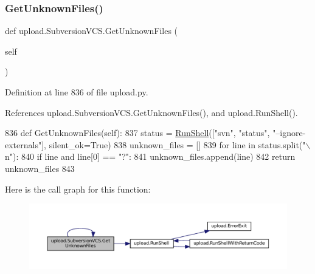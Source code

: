 \subsubsection{\texorpdfstring{Get\+Unknown\+Files()}{GetUnknownFiles()}\hspace{0.1cm}{\footnotesize\ttfamily [2/2]}}
{\footnotesize\ttfamily def upload.\+Subversion\+V\+C\+S.\+Get\+Unknown\+Files (\begin{DoxyParamCaption}\item[{}]{self }\end{DoxyParamCaption})}



Definition at line 836 of file upload.\+py.



References upload.\+Subversion\+V\+C\+S.\+Get\+Unknown\+Files(), and upload.\+Run\+Shell().


\begin{DoxyCode}
836   \textcolor{keyword}{def }GetUnknownFiles(self):
837     status = \hyperlink{namespaceupload_adddc423c49132e8879cbb25d6be2cf11}{RunShell}([\textcolor{stringliteral}{"svn"}, \textcolor{stringliteral}{"status"}, \textcolor{stringliteral}{"--ignore-externals"}], silent\_ok=\textcolor{keyword}{True})
838     unknown\_files = []
839     \textcolor{keywordflow}{for} line \textcolor{keywordflow}{in} status.split(\textcolor{stringliteral}{"\(\backslash\)n"}):
840       \textcolor{keywordflow}{if} line \textcolor{keywordflow}{and} line[0] == \textcolor{stringliteral}{"?"}:
841         unknown\_files.append(line)
842     \textcolor{keywordflow}{return} unknown\_files
843 
\end{DoxyCode}
Here is the call graph for this function\+:
\nopagebreak
\begin{figure}[H]
\begin{center}
\leavevmode
\includegraphics[width=350pt]{classupload_1_1SubversionVCS_a494ba1010992d83cac015bc396ab693a_cgraph}
\end{center}
\end{figure}
\mbox{\label{classupload_1_1SubversionVCS_a7d22d459469a757270502ce0dccacbd2}} 

